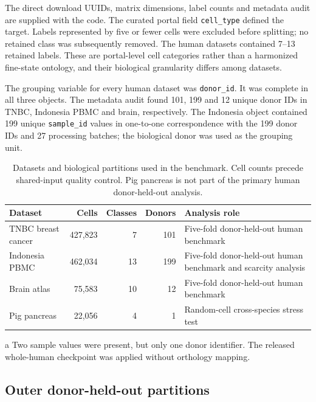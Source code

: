 The direct download UUIDs, matrix dimensions, label counts and metadata audit are supplied with the code. The curated portal field \texttt{cell\_type} defined the target. Labels represented by five or fewer cells were excluded before splitting; no retained class was subsequently removed. The human datasets contained 7--13 retained labels. These are portal-level cell categories rather than a harmonized fine-state ontology, and their biological granularity differs among datasets.

The grouping variable for every human dataset was \texttt{donor\_id}. It was complete in all three objects. The metadata audit found 101, 199 and 12 unique donor IDs in TNBC, Indonesia PBMC and brain, respectively. The Indonesia object contained 199 unique \texttt{sample\_id} values in one-to-one correspondence with the 199 donor IDs and 27 processing batches; the biological donor was used as the grouping unit.

\begin{table}[H]
\centering
\caption{Datasets and biological partitions used in the benchmark. Cell counts precede shared-input quality control. Pig pancreas is not part of the primary human donor-held-out analysis.}
\label{tab:datasets}
\begin{threeparttable}
\small
\setlength{\tabcolsep}{4.5pt}
\begin{tabularx}{\textwidth}{YrrrY}
\toprule
Dataset & Cells & Classes & Donors & Analysis role \\
\midrule
TNBC breast cancer & 427,823 & 7 & 101 & Five-fold donor-held-out human benchmark \\
Indonesia PBMC & 462,034 & 13 & 199 & Five-fold donor-held-out human benchmark and scarcity analysis \\
Brain atlas & 75,583 & 10 & 12 & Five-fold donor-held-out human benchmark \\
Pig pancreas & 22,056 & 4 & 1 & Random-cell cross-species stress test \\
\bottomrule
\end{tabularx}
\begin{tablenotes}\footnotesize
\item[a] Two sample values were present, but only one donor identifier. The released whole-human checkpoint was applied without orthology mapping.
\end{tablenotes}
\end{threeparttable}
\end{table}

\subsection{Outer donor-held-out partitions}

